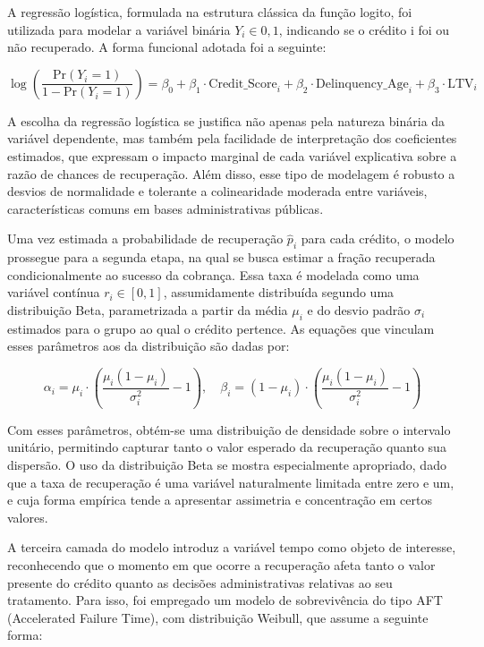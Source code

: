 \documentclass[a4paper,12pt]{article}
\begin{document}
A regressão logística, formulada na estrutura clássica da função logito, foi utilizada para modelar a variável binária $Y_i \in {0,1}$, indicando se o crédito i foi ou não recuperado. A forma funcional adotada foi a seguinte:

\[ \log \left( \frac{\text{Pr}(Y_i = 1)}{1 - \text{Pr}(Y_i = 1)} \right) = \beta_0 + \beta_1 \cdot \text{Credit\_Score}_i + \beta_2 \cdot \text{Delinquency\_Age}_i + \beta_3 \cdot \text{LTV}_i \]
 
A escolha da regressão logística se justifica não apenas pela natureza binária da variável dependente, mas também pela facilidade de interpretação dos coeficientes estimados, que expressam o impacto marginal de cada variável explicativa sobre a razão de chances de recuperação. Além disso, esse tipo de modelagem é robusto a desvios de normalidade e tolerante a colinearidade moderada entre variáveis, características comuns em bases administrativas públicas.

Uma vez estimada a probabilidade de recuperação $\hat{p}_{i}$ para cada crédito, o modelo prossegue para a segunda etapa, na qual se busca estimar a fração recuperada condicionalmente ao sucesso da cobrança. Essa taxa é modelada como uma variável contínua 
$r_{i} \in [0,1]$, assumidamente distribuída segundo uma distribuição Beta, parametrizada a partir da média $\mu_{i}$ e do desvio padrão $\sigma_{i}$ estimados para o grupo ao qual o crédito pertence. As equações que vinculam esses parâmetros aos da distribuição são dadas por:

\[ \alpha_i = \mu_i \cdot \left( \frac{\mu_i (1 - \mu_i)}{\sigma_i^2} - 1 \right), \quad \beta_i = (1 - \mu_i) \cdot \left( \frac{\mu_i (1 - \mu_i)}{\sigma_i^2} - 1 \right) \]

Com esses parâmetros, obtém-se uma distribuição de densidade sobre o intervalo unitário, permitindo capturar tanto o valor esperado da recuperação quanto sua dispersão. O uso da distribuição Beta se mostra especialmente apropriado, dado que a taxa de recuperação é uma variável naturalmente limitada entre zero e um, e cuja forma empírica tende a apresentar assimetria e concentração em certos valores.

A terceira camada do modelo introduz a variável tempo como objeto de interesse, reconhecendo que o momento em que ocorre a recuperação afeta tanto o valor presente do crédito quanto as decisões administrativas relativas ao seu tratamento. Para isso, foi empregado um modelo de sobrevivência do tipo AFT (Accelerated Failure Time), com distribuição Weibull, que assume a seguinte forma:
\end{document}

